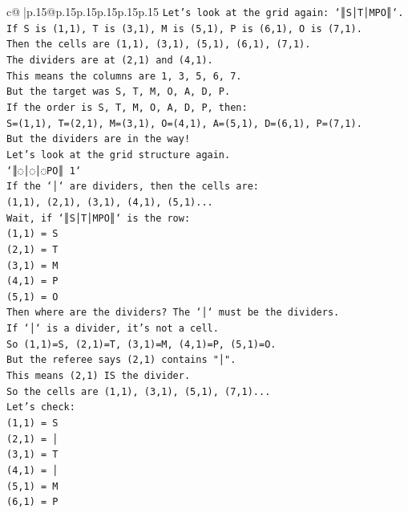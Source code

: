 \documentclass{article}
\begin{document}
{\begin{supertabular}{c@{$\;$}|p{.15\linewidth}@{}p{.15\linewidth}p{.15\linewidth}p{.15\linewidth}p{.15\linewidth}p{.15\linewidth}}
{{{\texttt{Let's look at the grid again: `║S│T│MPO║`.} \\
\texttt{If S is (1,1), T is (3,1), M is (5,1), P is (6,1), O is (7,1).} \\
\texttt{Then the cells are (1,1), (3,1), (5,1), (6,1), (7,1).} \\
\texttt{The dividers are at (2,1) and (4,1).} \\
\texttt{This means the columns are 1, 3, 5, 6, 7.} \\
\texttt{But the target was S, T, M, O, A, D, P.} \\
\texttt{If the order is S, T, M, O, A, D, P, then:} \\
\texttt{S=(1,1), T=(2,1), M=(3,1), O=(4,1), A=(5,1), D=(6,1), P=(7,1).} \\
\texttt{But the dividers are in the way!} \\
\texttt{Let's look at the grid structure again.} \\
\texttt{`║◌│◌│◌PO║ 1`} \\
\texttt{If the `│` are dividers, then the cells are:} \\
\texttt{(1,1), (2,1), (3,1), (4,1), (5,1)...} \\
\texttt{Wait, if `║S│T│MPO║` is the row:} \\
\texttt{(1,1) = S} \\
\texttt{(2,1) = T} \\
\texttt{(3,1) = M} \\
\texttt{(4,1) = P} \\
\texttt{(5,1) = O} \\
\texttt{Then where are the dividers? The `│` must be the dividers.} \\
\texttt{If `│` is a divider, it's not a cell.} \\
\texttt{So (1,1)=S, (2,1)=T, (3,1)=M, (4,1)=P, (5,1)=O.} \\
\texttt{But the referee says (2,1) contains "│".} \\
\texttt{This means (2,1) IS the divider.} \\
\texttt{So the cells are (1,1), (3,1), (5,1), (7,1)...} \\
\texttt{Let's check:} \\
\texttt{(1,1) = S} \\
\texttt{(2,1) = │} \\
\texttt{(3,1) = T} \\
\texttt{(4,1) = │} \\
\texttt{(5,1) = M} \\
\texttt{(6,1) = P} \\
}}}
\end{supertabular}}
\end{document}

